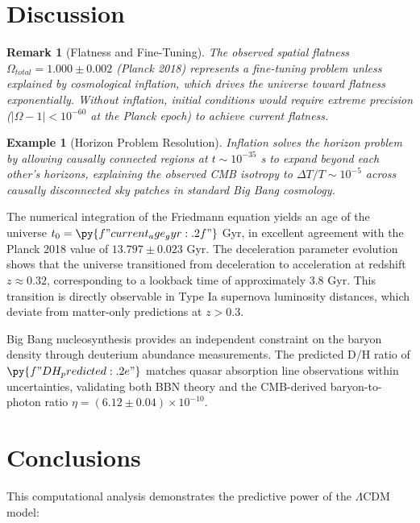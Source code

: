 \documentclass[a4paper, 11pt]{article}
\newtheorem{example}{Example}[section]
\newtheorem{remark}{Remark}[section]
\begin{document}
\section{Discussion}

\begin{remark}[Flatness and Fine-Tuning]
The observed spatial flatness $\Omega_{total} = 1.000 \pm 0.002$ (Planck 2018) represents
a fine-tuning problem unless explained by cosmological inflation, which drives the universe
toward flatness exponentially. Without inflation, initial conditions would require extreme
precision ($|\Omega - 1| < 10^{-60}$ at the Planck epoch) to achieve current flatness.
\end{remark}

\begin{example}[Horizon Problem Resolution]
Inflation solves the horizon problem by allowing causally connected regions at $t \sim 10^{-35}$ s
to expand beyond each other's horizons, explaining the observed CMB isotropy to $\Delta T/T \sim 10^{-5}$
across causally disconnected sky patches in standard Big Bang cosmology.
\end{example}

The numerical integration of the Friedmann equation yields an age of the universe
$t_0 = \py{f"{current_age_gyr:.2f}"}$ Gyr, in excellent agreement with the Planck 2018 value
of $13.797 \pm 0.023$ Gyr. The deceleration parameter evolution shows that the universe
transitioned from deceleration to acceleration at redshift $z \approx 0.32$, corresponding
to a lookback time of approximately 3.8 Gyr. This transition is directly observable in Type Ia
supernova luminosity distances, which deviate from matter-only predictions at $z > 0.3$.

Big Bang nucleosynthesis provides an independent constraint on the baryon density through
deuterium abundance measurements. The predicted D/H ratio of $\py{f"{DH_predicted:.2e}"}$
matches quasar absorption line observations within uncertainties, validating both BBN theory
and the CMB-derived baryon-to-photon ratio $\eta = (6.12 \pm 0.04) \times 10^{-10}$.

\section{Conclusions}

This computational analysis demonstrates the predictive power of the $\Lambda$CDM model:
\end{document}
